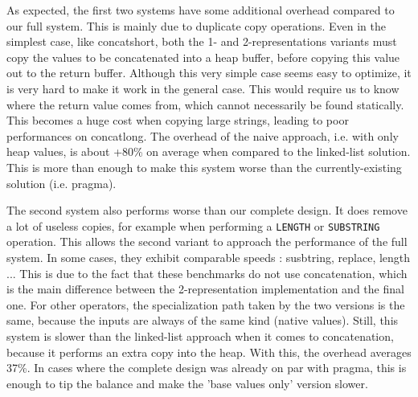 \documentclass[twoside,11pt,a4paper]{article}
\newcommand{\pls}[1]{\small\texttt{#1}\normalsize}
\newcommand{\benchsystem}[1]{\textsf{#1}}
\newcommand{\ncpg}{\benchsystem{pragma}}
\newcommand{\bench}[1]{\textsf{#1}}
\begin{document}
As expected, the first two systems have some additional overhead compared to our full system. This is mainly due to duplicate copy operations. Even in the simplest case, like \bench{concatshort}, both the 1- and 2-representations variants must copy the values to be concatenated into a heap buffer, before copying this value out to the return buffer. Although this very simple case seems easy to optimize, it is very hard to make it work in the general case. This would require us to know where the return value comes from, which cannot necessarily be found statically. This becomes a huge cost when copying large strings, leading to poor performances on \bench{concatlong}. The overhead of the naive approach, i.e. with only heap values, is about +80\% on average when compared to the linked-list solution. This is more than enough to make this system worse than the currently-existing solution (i.e. \ncpg{}).

The second system also performs worse than our complete design. It does remove a lot of useless copies, for example when performing a \pls{LENGTH} or \pls{SUBSTRING} operation. This allows the second variant to approach the performance of the full system. In some cases, they exhibit comparable speeds : \bench{susbtring}, \bench{replace}, \bench{length} ... This is due to the fact that these benchmarks do not use concatenation, which is the main difference between the 2-representation implementation and the final one. For other operators, the specialization path taken by the two versions is the same, because the inputs are always of the same kind (native values). Still, this system is slower than the linked-list approach when it comes to concatenation, because it performs an extra copy into the heap. With this, the overhead averages 37\%. In cases where the complete design was already on par with \ncpg{}, this is enough to tip the balance and make the 'base values only' version slower.
\end{document}
